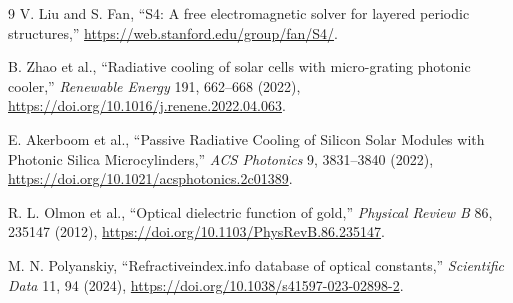\documentclass[11pt,a4paper,twoside]{article}
\begin{document}
{}
\footnotesize
\begin{thebibliography}{9}
V. Liu and S. Fan, ``S4: A free electromagnetic solver for layered periodic
structures,'' \url{https://web.stanford.edu/group/fan/S4/}.

B. Zhao et al., ``Radiative cooling of solar cells with micro-grating photonic
cooler,'' \emph{Renewable Energy} 191, 662--668 (2022),
\url{https://doi.org/10.1016/j.renene.2022.04.063}.

E. Akerboom et al., ``Passive Radiative Cooling of Silicon Solar Modules with
Photonic Silica Microcylinders,'' \emph{ACS Photonics} 9, 3831--3840 (2022),
\url{https://doi.org/10.1021/acsphotonics.2c01389}.

R. L. Olmon et al., ``Optical dielectric function of gold,''
\emph{Physical Review B} 86, 235147 (2012),
\url{https://doi.org/10.1103/PhysRevB.86.235147}.

M. N. Polyanskiy, ``Refractiveindex.info database of optical constants,''
\emph{Scientific Data} 11, 94 (2024),
\url{https://doi.org/10.1038/s41597-023-02898-2}.

\end{thebibliography}
\end{document}
